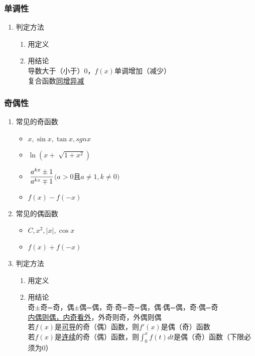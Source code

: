 \subsubsection{单调性}

\begin{enumerate}
    \item 判定方法\begin{enumerate}
        \item 用定义
        \item 用结论\\
        导数大于（小于）0，$f(x)$单调增加（减少）\\
        复合函数\underline{同增异减}
    \end{enumerate}
\end{enumerate}

\subsubsection{奇偶性}

\begin{enumerate}
    \item 常见的奇函数\begin{itemize}
        \item $x, \sin x, \tan x, sgn x$
        \item $\ln (x+\sqrt[]{1+x^2})$
        \item $\displaystyle\hspace{.2em}\frac{a^{kx}\pm 1}{a^{kx}\mp 1}$$(a>0$且$a \ne 1, k \ne 0)$
        \item \underline{$f(x)-f(-x)$}
    \end{itemize}
    \item 常见的偶函数\begin{itemize}
        \item $C, x^2, |x|, \cos x$
        \item \underline{$f(x)+f(-x)$}
    \end{itemize}
    \item 判定方法\begin{enumerate}
        \item 用定义
        \item 用结论\\
        奇$\pm$奇=奇，偶$\pm$偶=偶，奇$\cdot$奇=奇=偶，偶$\cdot$偶=偶，奇$\cdot$偶=奇\\
        \underline{内偶则偶，内奇看外}，外奇则奇，外偶则偶\\
        若$f(x)$是\underline{可导}的奇（偶）函数，则$f'(x)$是偶（奇）函数\\
        若$f(x)$是\underline{连续}的奇（偶）函数，则$\int_{0}^{x}f(t)dt$是偶（奇）函数（下限必须为0）
    \end{enumerate}
\end{enumerate}

